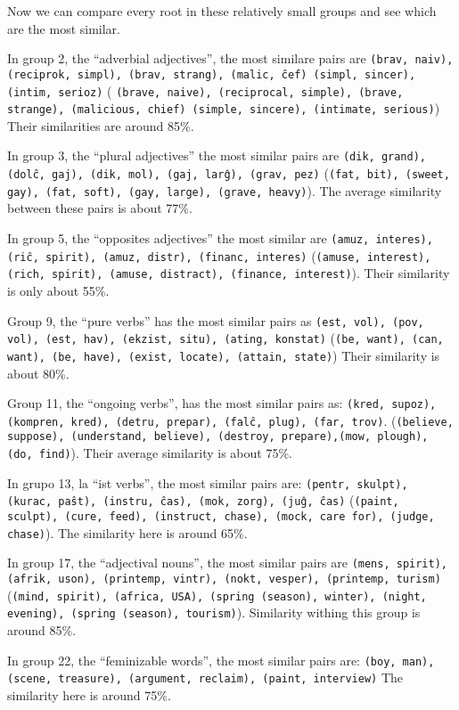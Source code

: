 \documentclass[12pt,twoside]{article}
\begin{document}
Now we can compare every root in these relatively small groups and see which are the most similar.

In group 2, the ``adverbial adjectives'', the most similare pairs are  \texttt{(brav, naiv), (reciprok, simpl), (brav, strang), (malic, ĉef)
(simpl, sincer), (intim, serioz)} ( \texttt{(brave, naive), (reciprocal, simple), (brave, strange), (malicious, chief) (simple, sincere), (intimate, serious)})
Their similarities are around 85\%.

In group 3, the ``plural adjectives'' the most similar pairs are  \texttt{(dik, grand), (dolĉ, gaj), (dik, mol), (gaj, larĝ), (grav, pez)} 
(\texttt{(fat, bit), (sweet, gay), (fat, soft), (gay, large), (grave, heavy)}). The average similarity between these pairs is about 77\%.

In group 5, the ``opposites adjectives'' the most similar are \texttt{(amuz, interes), (riĉ, spirit), (amuz, distr), (financ, interes)}
(\texttt{(amuse, interest), (rich, spirit), (amuse, distract), (finance, interest)}). Their similarity is only about 55\%.

Group 9, the ``pure verbs'' has the most similar pairs as \texttt{(est, vol), (pov, vol), (est, hav), (ekzist, situ), (ating, konstat)}
(\texttt{(be, want), (can, want), (be, have), (exist, locate), (attain, state)}) Their similarity is about 80\%.

Group 11, the ``ongoing verbs'', has the most similar pairs as: \texttt{(kred, supoz), (kompren, kred), (detru, prepar), (falĉ, plug), (far, trov)}.
(\texttt{(believe, suppose), (understand, believe), (destroy, prepare),(mow, plough), (do, find)}). Their average similarity is about 75\%.

In grupo 13, la ``ist verbs'', the most similar pairs are: \texttt{(pentr, skulpt), (kurac, paŝt), (instru, ĉas), (mok, zorg), (juĝ, ĉas)}
(\texttt{(paint, sculpt), (cure, feed), (instruct, chase), (mock, care for), (judge, chase)}). The similarity here is around 65\%.

In group 17, the ``adjectival nouns'', the most similar pairs are \texttt{(mens, spirit), (afrik, uson),
(printemp, vintr), (nokt, vesper), (printemp, turism)}
(\texttt{(mind, spirit), (africa, USA), (spring (season), winter), (night, evening), (spring (season), tourism)}). 
Similarity withing this group is around 85\%.  

In group 22, the ``feminizable words'', the most similar pairs are: \texttt{(boy, man), (scene, treasure), (argument, reclaim), (paint, interview)}
The similarity here is around 75\%.
\end{document}
